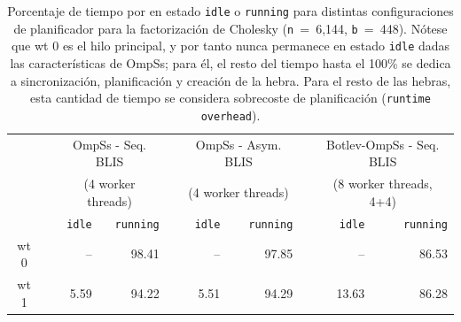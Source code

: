 \begin{table}
\centering
	\caption{Porcentaje de tiempo por \wt en estado {\tt idle} o {\tt running} para distintas configuraciones de planificador para la factorización de Cholesky
({\tt n}~=~6,144, {\tt b}~=~448).
	Nótese que {\sc wt 0} es el hilo principal, y por tanto nunca permanece en estado {\tt idle} dadas las características de OmpSs; 
	para él, el resto del tiempo hasta el 100\% se dedica a sincronización, planificación y creación de la hebra. Para el resto de las hebras, esta cantidad
	de tiempo se considera sobrecoste de planificación ({\tt runtime overhead}).}
\label{tab:th_state}

\ca{2pt}

\renewcommand{\fg}[1]{{#1}} 
\renewcommand{\br}[1]{{#1}} 

{\scriptsize
\begin{tabular}{crrrrrrrrr} 
   	\toprule
                 & \phantom{a} & \multicolumn{2}{c}{OmpSs - Seq. BLIS} & \phantom{ab} & \multicolumn{2}{c}{OmpSs - Asym. BLIS} & \phantom{ab} & \multicolumn{2}{c}{Botlev-OmpSs - Seq. BLIS} \\ 
                 & \phantom{a} & \multicolumn{2}{c}{(4 worker threads)} & \phantom{ab} & \multicolumn{2}{c}{(4 worker threads)} & \phantom{ab} & \multicolumn{2}{c}{(8 worker threads, 4+4)} \\ 
                                          \cmidrule{3-4}                                         \cmidrule{6-7}                                      \cmidrule{9-10}
                       & \phantom{a} &    {\tt idle}& {\tt running}& \phantom{ab}  & {\tt idle}& {\tt running}& \phantom{ab} & {\tt idle}  & {\tt running} \\ \hline 
	 {\sc wt 0}    & \phantom{a} &    \fg{--}   & \fg{98.41}   & \phantom{ab}  & \fg{--}   & \fg{97.85}   & \phantom{ab} & \fg{--}     & \fg{86.53}    \\ \cline{3-10}
	 {\sc wt 1}    & \phantom{a} &    \br{5.59} & \fg{94.22}   & \phantom{ab}  & \fg{5.51} & \fg{94.29}   & \phantom{ab} & \fg{13.63}  & \fg{86.28}    \\ \cline{3-10}

\end{tabular}}
\end{table}
